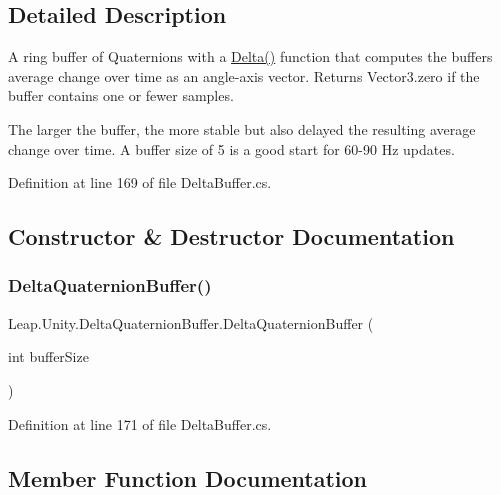 \subsection{Detailed Description}
A ring buffer of Quaternions with a \mbox{\hyperlink{class_leap_1_1_unity_1_1_delta_quaternion_buffer_a4e3c9ef1beee10efb295719e81cdf766}{Delta()}} function that computes the buffer\textquotesingle{}s average change over time as an angle-\/axis vector. Returns Vector3.\+zero if the buffer contains one or fewer samples. 

The larger the buffer, the more stable but also delayed the resulting average change over time. A buffer size of 5 is a good start for 60-\/90 Hz updates. 

Definition at line 169 of file Delta\+Buffer.\+cs.



\subsection{Constructor \& Destructor Documentation}
\mbox{\label{class_leap_1_1_unity_1_1_delta_quaternion_buffer_a8cb7e602d39297195043cc232773f7c9}} 
\subsubsection{\texorpdfstring{DeltaQuaternionBuffer()}{DeltaQuaternionBuffer()}}
{\footnotesize\ttfamily Leap.\+Unity.\+Delta\+Quaternion\+Buffer.\+Delta\+Quaternion\+Buffer (\begin{DoxyParamCaption}\item[{int}]{buffer\+Size }\end{DoxyParamCaption})}



Definition at line 171 of file Delta\+Buffer.\+cs.



\subsection{Member Function Documentation}
\mbox{\label{class_leap_1_1_unity_1_1_delta_quaternion_buffer_a4e3c9ef1beee10efb295719e81cdf766}} 
